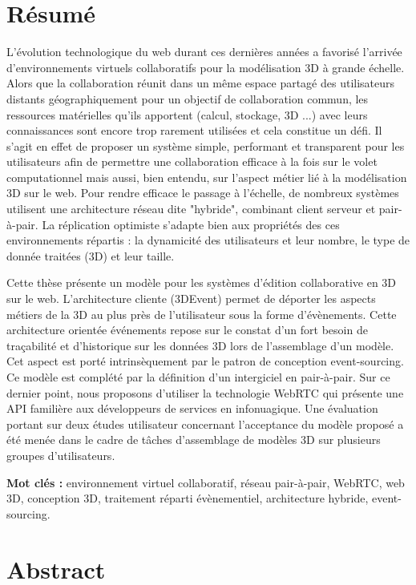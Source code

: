 \pagestyle{empty} 
\clearpage
\pagebreak
{\centering
\section*{Résumé}}
\small 
L’évolution technologique du web durant ces dernières années a favorisé l’arrivée 
d’environnements virtuels collaboratifs pour la modélisation 3D à grande échelle. 
Alors que la collaboration réunit dans un même espace partagé des utilisateurs 
distants géographiquement pour un objectif de collaboration commun, les 
ressources 
matérielles qu'ils apportent (calcul, stockage, 3D ...) avec leurs connaissances 
sont encore trop rarement utilisées et cela constitue un défi. Il s'agit en effet 
de proposer un système simple, performant et transparent pour les utilisateurs 
afin de permettre une collaboration efficace à la fois sur le volet computationnel 
mais aussi, bien entendu, sur l'aspect métier lié à la modélisation 3D sur le web.
Pour rendre efficace le passage à l’échelle, de nombreux systèmes utilisent une 
architecture réseau dite "hybride", combinant client serveur et pair-à-pair. La 
réplication optimiste s'adapte bien aux propriétés des ces environnements répartis 
: la dynamicité des utilisateurs et leur nombre, le type de donnée traitées (3D) 
et leur taille. 

Cette thèse présente un modèle pour les systèmes d’édition collaborative en 3D 
sur le web. L'architecture cliente (3DEvent) permet de déporter les 
aspects métiers de la 3D au plus près de l’utilisateur sous la forme d’évènements. 
Cette architecture orientée événements repose sur le constat 
d’un fort besoin de traçabilité et d’historique sur les données 3D lors de 
l’assemblage d’un modèle. Cet aspect est porté intrinsèquement par le patron de 
conception event-sourcing. Ce modèle est complété par la définition d’un 
intergiciel en pair-à-pair. Sur ce dernier point, nous proposons d'utiliser la 
technologie WebRTC qui présente une API familière aux développeurs de services 
en infonuagique. Une évaluation portant sur deux études utilisateur concernant 
l’acceptance du modèle proposé a été menée dans le cadre de tâches 
d’assemblage de 
modèles 3D sur plusieurs groupes d’utilisateurs.

\textbf{Mot clés :} environnement virtuel collaboratif, réseau pair-à-pair, 
WebRTC, web 3D, conception 3D, traitement réparti évènementiel, architecture 
hybride, event-sourcing.

{\centering
\section*{Abstract}}

